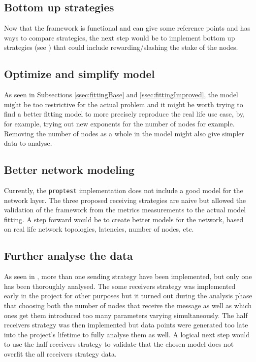 \subsection{Bottom up strategies}
Now that the framework is functional and can give some reference points and has
ways to compare strategies, the next step would be to implement bottom
up strategies (see ) that could include
rewarding/slashing the stake of the nodes.

\subsection{Optimize and simplify model}
As seen in Subsections \ref{ssec:fittingBase} and \ref{ssec:fittingImproved},
the model might be too restrictive for the actual problem and it might be worth
trying to find a better fitting model to more precisely reproduce the real life
use case, by, for example, trying out new exponents for the number of nodes for
example. Removing the number of nodes as a whole in the model might also give
simpler data to analyse.

\subsection{Better network modeling}
Currently, the \texttt{proptest} implementation does not include a good model
for the network layer. The three proposed receiving strategies are naive but
allowed the validation of the framework from the metrics measurements to the actual
model fitting. A step forward would be to create better models for the
network, based on real life network topologies, latencies, number of nodes, etc.

\subsection{Further analyse the data}
As seen in , more than one sending strategy have been
implemented, but only one has been thoroughly analysed. The some receivers
strategy was implemented early in the project for other purposes but it turned
out during the analysis phase that choosing both the number of nodes that receive
the message as well as which ones get them introduced too many parameters
varying simultaneously. The half receivers strategy was then implemented but data points
were generated too late into the project's lifetime to fully analyse them as
well. A logical next step would to use the half receivers strategy to validate
that the chosen model does not overfit the all receivers strategy data.
